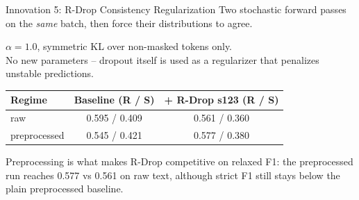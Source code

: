 \documentclass[aspectratio=169,10pt]{beamer}
\begin{document}
\begin{frame}{Innovation 5: R-Drop Consistency Regularization}
  Two stochastic forward passes on the \emph{same} batch, then force their distributions to agree.
  \medskip

  \centering
  \medskip

  \footnotesize
  $\alpha = 1.0$, symmetric KL over non-masked tokens only. \\
  No new parameters --
  dropout itself is used as a regularizer that penalizes unstable predictions.
  \medskip

  \begin{center}\footnotesize
  \begin{tabular}{lcc}
    \toprule
    Regime & Baseline (R / S) & + R-Drop s123 (R / S) \\
    \midrule
    raw & 0.595 / 0.409 & 0.561 / 0.360 \\
    preprocessed & 0.545 / 0.421 & 0.577 / 0.380 \\
    \bottomrule
  \end{tabular}
  \end{center}
  \vspace{-0.2em}
  \footnotesize Preprocessing is what makes R-Drop competitive on relaxed F1: the preprocessed run reaches 0.577 vs 0.561 on raw text, although strict F1 still stays below the plain preprocessed baseline.
\end{frame}
\end{document}
